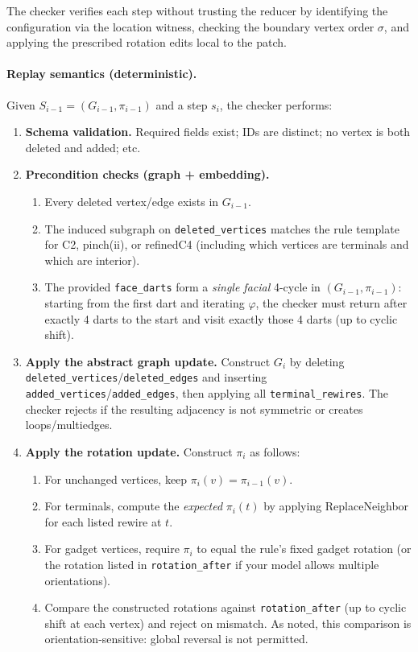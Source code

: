\documentclass[12pt]{article}
\theoremstyle{definition}
\begin{document}
The checker verifies each step without trusting the reducer by identifying the configuration via the location witness, checking the boundary vertex order $\sigma$, and applying the prescribed rotation edits local to the patch.

\paragraph{Replay semantics (deterministic).}
Given $S_{i-1}=(G_{i-1},\pi_{i-1})$ and a step $s_i$, the checker performs:

\begin{enumerate}
\item \textbf{Schema validation.} Required fields exist; IDs are distinct; no vertex is both deleted and added; etc.
\item \textbf{Precondition checks (graph + embedding).}
\begin{enumerate}
\item Every deleted vertex/edge exists in $G_{i-1}$.
\item The induced subgraph on \texttt{deleted\_vertices} matches the rule template for \textsf{C2}, \textsf{pinch(ii)}, or \textsf{refinedC4}
(including which vertices are terminals and which are interior).
\item The provided \texttt{face\_darts} form a \emph{single facial} 4-cycle in $(G_{i-1},\pi_{i-1})$:
starting from the first dart and iterating $\varphi$, the checker must return after exactly 4 darts to the start
and visit exactly those 4 darts (up to cyclic shift).
\end{enumerate}

\item \textbf{Apply the abstract graph update.}
Construct $G_i$ by deleting \texttt{deleted\_vertices}/\texttt{deleted\_edges} and inserting
\texttt{added\_vertices}/\texttt{added\_edges}, then applying all \texttt{terminal\_rewires}.
The checker rejects if the resulting adjacency is not symmetric or creates loops/multiedges.

\item \textbf{Apply the rotation update.}
Construct $\pi_i$ as follows:
\begin{enumerate}
\item For unchanged vertices, keep $\pi_i(v)=\pi_{i-1}(v)$.
\item For terminals, compute the \emph{expected} $\pi_i(t)$ by applying ReplaceNeighbor for each listed rewire at $t$.
\item For gadget vertices, require $\pi_i$ to equal the rule’s fixed gadget rotation (or the rotation listed in \texttt{rotation\_after} if your model allows multiple orientations).
\item Compare the constructed rotations against \texttt{rotation\_after} (up to cyclic shift at each vertex) and reject on mismatch. As noted, this comparison is orientation-sensitive: global reversal is not permitted.
\end{enumerate}


\end{enumerate}
\end{document}
